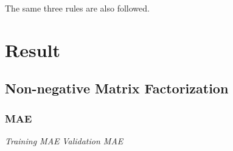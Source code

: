 \documentclass[12pt]{article}
\begin{document}
    \quad The same three rules are also followed.

\newpage \section{Result}

  \subsection{Non-negative Matrix Factorization}

    \subsubsection{MAE}

      \begin{center}
        \textit{Training MAE} \qquad \qquad \qquad \quad \textit{Validation MAE}


\end{center}
\end{document}
